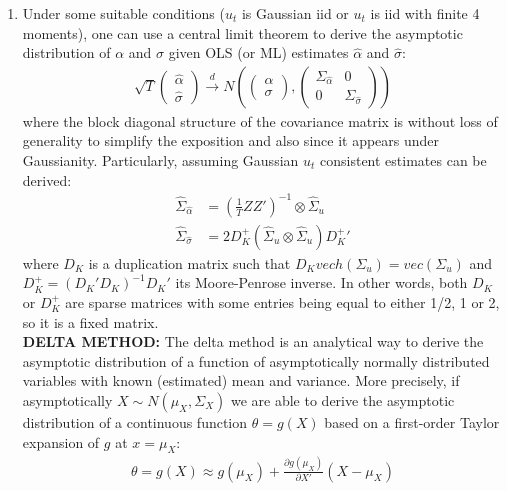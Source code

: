 \begin{enumerate}
\item Under some suitable conditions (\(u_{t}\) is Gaussian iid or \(u_{t}\) is iid with finite 4 moments),
  one can use a central limit theorem to derive the asymptotic distribution of \(\alpha \) and \(\sigma \)
  given OLS (or ML) estimates \(\hat{\alpha}\) and \(\hat{\sigma}\):
\begin{align*}
\sqrt{T} \begin{pmatrix} \hat{\alpha}\\ \hat{\sigma}\end{pmatrix}
\overset{d}{\longrightarrow} N \left(
  \begin{pmatrix} \alpha \\ \sigma \end{pmatrix},
  \begin{pmatrix} \Sigma_{\hat{\alpha}} & 0 \\ 0 & \Sigma_{\hat{\sigma}}\end{pmatrix}
\right)
\end{align*}
  where the block diagonal structure of the covariance matrix is without loss of generality
  to simplify the exposition and also since it appears under Gaussianity.
Particularly, assuming Gaussian \(u_{t}\) consistent estimates can be derived:
\begin{align*}
\hat{\Sigma}_{\hat{\alpha}} &= \left(\frac{1}{T} Z Z'\right)^{-1} \otimes \hat{\Sigma}_u
\\
\hat{\Sigma}_{\hat{\sigma}} &= 2 D_K^{+} \left(\hat{\Sigma}_u \otimes \hat{\Sigma}_u \right) {D_K^{+}}'
\end{align*}
where \(D_K\) is a duplication matrix such that \(D_K vech(\Sigma_u) = vec(\Sigma_u)\) and \(D_K^{+} = {(D_K' D_K)}^{-1} D_K'\) its Moore-Penrose inverse.
In other words, both \(D_K\) or \(D_K^{+}\) are sparse matrices with some entries being equal to either 1/2, 1 or 2,
  so it is a fixed matrix.
\\
\noindent\textbf{DELTA METHOD:}
The delta method is an analytical way to derive the asymptotic distribution of a function of asymptotically normally distributed variables
  with known (estimated) mean and variance.
More precisely, if asymptotically \(X \sim N(\mu_X,\Sigma_X)\)
  we are able to derive the asymptotic distribution of a continuous function \(\theta = g(X)\) based on a first-order Taylor expansion of \(g\) at \(x = \mu_X\):
\begin{align*}
\theta = g(X) \approx g(\mu_X) + \frac{\partial g(\mu_X)}{\partial X'} (X - \mu_X)

\end{align*}
\end{enumerate}
